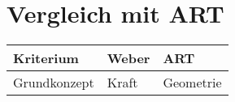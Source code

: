 \section{Vergleich mit ART}
\begin{table}[H]
    \centering
    \begin{tabular}{lp{4cm}p{4cm}}
        \toprule
        Kriterium & Weber & ART \\
        \midrule
        Grundkonzept & Kraft & Geometrie \\
        \bottomrule
    \end{tabular}
\end{table}